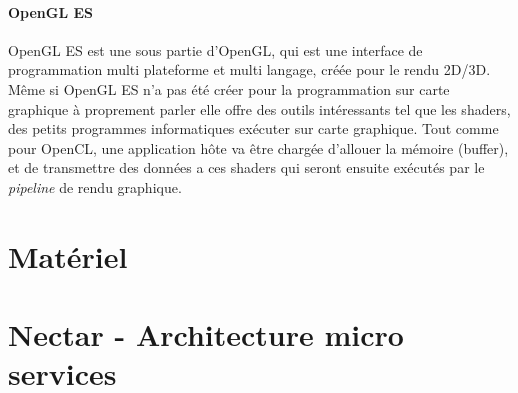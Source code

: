 \paragraph{OpenGL ES} OpenGL ES est une sous partie d'OpenGL, qui est une interface de programmation multi plateforme et multi langage, créée pour le rendu 2D/3D. Même si OpenGL ES n'a pas été créer pour la programmation sur carte graphique à proprement parler elle offre des outils intéressants tel que les shaders, des petits programmes informatiques exécuter sur carte graphique. Tout comme pour OpenCL, une application hôte va être chargée d'allouer la mémoire (buffer), et de transmettre des données a ces shaders qui seront ensuite exécutés par le \emph{pipeline} de rendu graphique.




\section{Matériel}

\section{Nectar - Architecture micro services}

